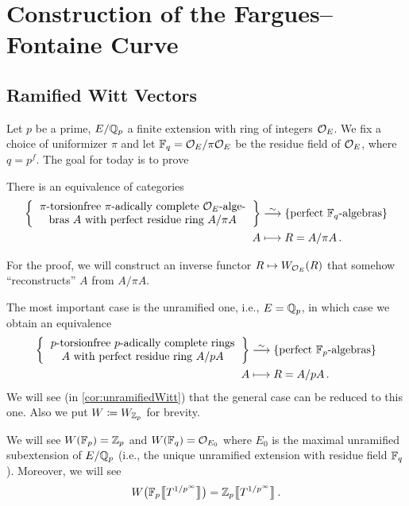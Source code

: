 \chapter{Construction of the Fargues--Fontaine Curve}
\section{Ramified Witt Vectors}
Let $p$ be a prime, $E/\mathbb{Q}_p$ a finite extension with ring of integers $\mathcal{O}_E$. We fix a choice of uniformizer $\pi$ and let $\mathbb{F}_q=\mathcal{O}_E/\pi\mathcal{O}_E$ be the residue field of $\mathcal{O}_E$, where $q=p^f$. The goal for today is to prove
\begin{prop}\label{prop:FqAlgebrasEquivalence}
	There is an equivalence of categories
	\begin{align*}
		\left\{\begin{tabular}{c}
			$\pi$-torsionfree $\pi$-adically complete $\Oo_E$-alge-\\
			bras $A$ with perfect residue ring $A/\pi A$
		\end{tabular}
		\right\}&\isomorphism\left\{\text{perfect $\IF_q$-algebras}\right\}\\
		A&\longmapsto R=A/\pi A\,.
	\end{align*}
\end{prop}
For the proof, we will construct an inverse functor $R\mapsto W_{\mathcal{O}_E}(R)$ that somehow \enquote{reconstructs} $A$ from $A/\pi A$.
\begin{rem}
	The most important case is the unramified one, i.e., $E=\mathbb{Q}_p$, in which case we obtain an equivalence
	\begin{align*}
	\left\{\begin{tabular}{c}
	$p$-torsionfree $p$-adically complete rings\\
	$A$ with perfect residue ring $A/pA$
	\end{tabular}
	\right\}&\isomorphism\left\{\text{perfect $\IF_p$-algebras}\right\}\\
	A&\longmapsto R=A/p A\,.
	\end{align*}
	We will see (in \cref{cor:unramifiedWitt}) that the general case can be reduced to this one. Also we put $W\coloneqq W_{\mathbb{Z}_p}$ for brevity.
\end{rem}
We will see $W(\mathbb{F}_p)=\mathbb{Z}_p$ and $W(\mathbb{F}_q)=\mathcal{O}_{E_0}$ where $E_0$ is the maximal unramified subextension of $E/\mathbb{Q}_p$ (i.e., the unique unramified extension with residue field $\mathbb{F}_q$). Moreover, we will see
	\begin{equation*}
		W\big(\mathbb{F}_p\big\llbracket T^{1/p^\infty}\big\rrbracket\big)=\mathbb{Z}_p\big\llbracket T^{1/p^\infty}\big\rrbracket\,.
	\end{equation*}
	
